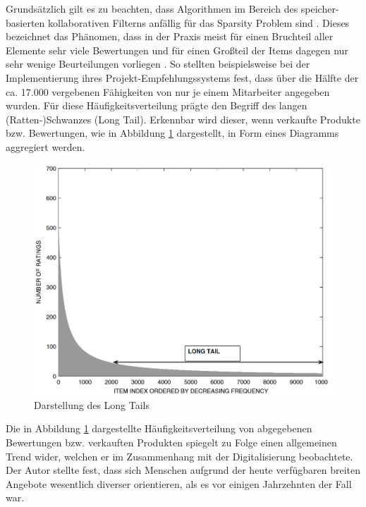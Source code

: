 Grundsätzlich gilt es zu beachten, dass Algorithmen im Bereich des speicher-basierten kollaborativen Filterns anfällig für das Sparsity Problem sind \cite[S. 3f.]{grvcar:2006}. Dieses bezeichnet das Phänomen, dass in der Praxis meist für einen Bruchteil aller Elemente sehr viele Bewertungen und für einen Großteil der Items dagegen nur sehr wenige Beurteilungen vorliegen \cite[S. 8]{recommenderSystems:2016}. So stellten beispielsweise \textcite[S. 3]{mitre:2014} bei der Implementierung ihres Projekt-Empfehlungssystems fest, dass über die Hälfte der ca. 17.000 vergebenen Fähigkeiten von nur je einem Mitarbeiter angegeben wurden.
Für diese Häufigkeitsverteilung prägte \textcite[S. 12]{anderson:2007} den Begriff des langen (Ratten-)Schwanzes (Long Tail). Erkennbar wird dieser, wenn verkaufte Produkte bzw. Bewertungen, wie in Abbildung \ref{fig:empfehlungssysteme:cf:speicherbasiert:abb1} dargestellt, in Form eines Diagramms aggregiert werden.

\begin{figure}[h]
	\centering
	\includegraphics[width=1\textwidth]{gfx/long-tail.png}
	\caption{Darstellung des Long Tails \cite[S. 33]{recommenderSystems:2016}}
	\label{fig:empfehlungssysteme:cf:speicherbasiert:abb1}
\end{figure}

Die in Abbildung \ref{fig:empfehlungssysteme:cf:speicherbasiert:abb1} dargestellte Häufigkeitsverteilung von abgegebenen Bewertungen bzw. verkauften Produkten spiegelt \textcite[S. 1ff.]{anderson:2007} zu Folge einen allgemeinen Trend wider, welchen er im Zusammenhang mit der Digitalisierung beobachtete. Der Autor stellte fest, dass sich Menschen aufgrund der heute verfügbaren breiten Angebote wesentlich diverser orientieren, als es vor einigen Jahrzehnten der Fall war.

